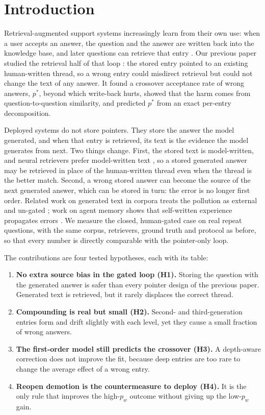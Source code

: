 \documentclass[11pt]{article}
\begin{document}
\section{Introduction}
Retrieval-augmented support systems increasingly learn from their own use: when a user accepts an answer, the question and the answer are written back into the knowledge base, and later questions can retrieve that entry \citep{liu2026vigil,wang2026linkedin,omrag2026,kcs}. Our previous paper studied the retrieval half of that loop \citep{guthikonda2026accepted}: the stored entry pointed to an existing human-written thread, so a wrong entry could misdirect retrieval but could not change the text of any answer. It found a crossover acceptance rate of wrong answers, $p^*$, beyond which write-back hurts, showed that the harm comes from question-to-question similarity, and predicted $p^*$ from an exact per-entry decomposition.

Deployed systems do not store pointers. They store the answer the model generated, and when that entry is retrieved, its text is the evidence the model generates from next. Two things change. First, the stored text is model-written, and neural retrievers prefer model-written text \citep{dai2024sourcebias,chen2024spiral}, so a stored generated answer may be retrieved in place of the human-written thread even when the thread is the better match. Second, a wrong stored answer can become the source of the next generated answer, which can be stored in turn: the error is no longer first order. Related work on generated text in corpora treats the pollution as external and un-gated \citep{yu2026collapse,druck2026ragcollapse}; work on agent memory shows that self-written experience propagates errors \citep{xiong2025memory,shao2025misevolve}. We measure the closed, human-gated case on real repeat questions, with the same corpus, retrievers, ground truth and protocol as before, so that every number is directly comparable with the pointer-only loop.

The contributions are four tested hypotheses, each with its table:
\begin{enumerate}
\item \textbf{No extra source bias in the gated loop (H1).} Storing the question with the generated answer is safer than every pointer design of the previous paper. Generated text is retrieved, but it rarely displaces the correct thread.
\item \textbf{Compounding is real but small (H2).} Second- and third-generation entries form and drift slightly with each level, yet they cause a small fraction of wrong answers.
\item \textbf{The first-order model still predicts the crossover (H3).} A depth-aware correction does not improve the fit, because deep entries are too rare to change the average effect of a wrong entry.
\item \textbf{Reopen demotion is the countermeasure to deploy (H4).} It is the only rule that improves the high-$p_w$ outcome without giving up the low-$p_w$ gain.
\end{enumerate}
\end{document}
